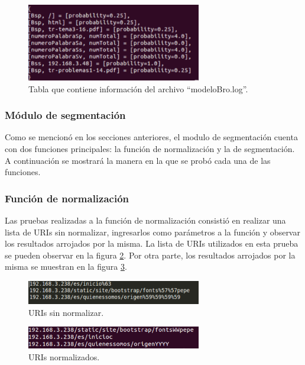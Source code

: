 \begin{figure}[!htb]
\begin{center}
\includegraphics[width=3in]{./img/tablaModeloBro.png}
\caption{Tabla que contiene información del archivo ``modeloBro.log''.}
\label{fig:modelResult}
\end{center}
\end{figure}

\subsubsection{Módulo de segmentación}

Como se mencionó en los secciones anteriores, el modulo de segmentación
cuenta con dos funciones principales: la función de normalización y la de
segmentación. A continuación se mostrará la manera en la que se probó cada una de las funciones.

\subsubsection*{Función de normalización}

Las pruebas realizadas a la función de normalización consistió en realizar una lista de URIs sin normalizar, ingresarlos como parámetros a la función y observar los resultados arrojados por la misma.
La lista de URIs utilizados en esta prueba se pueden observar en la figura \ref{fig:uriSinNorm}. Por otra parte, los resultados arrojados por la misma se muestran en la
figura \ref{fig:uriNorm}.

\begin{figure}[!htb]
\begin{center}
\includegraphics[width=3in]{./img/uriSinNorm.png}
\caption{URIs sin normalizar.}
\label{fig:uriSinNorm}
\end{center}
\end{figure}

\begin{figure}[!htb]
\begin{center}
\includegraphics[width=3in]{./img/uriNorm.png}
\caption{URIs normalizados.}
\label{fig:uriNorm}
\end{center}
\end{figure}


